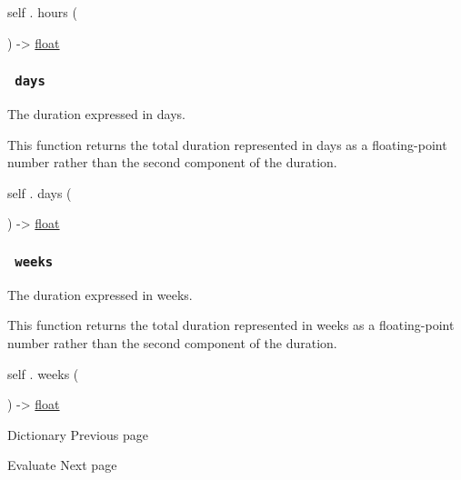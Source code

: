 self { . } { hours } (

) -\textgreater{} \href{/docs/reference/foundations/float/}{float}

\subsubsection{\texorpdfstring{\texttt{\ days\ }}{ days }}\label{definitions-days}

The duration expressed in days.

This function returns the total duration represented in days as a
floating-point number rather than the second component of the duration.

self { . } { days } (

) -\textgreater{} \href{/docs/reference/foundations/float/}{float}

\subsubsection{\texorpdfstring{\texttt{\ weeks\ }}{ weeks }}\label{definitions-weeks}

The duration expressed in weeks.

This function returns the total duration represented in weeks as a
floating-point number rather than the second component of the duration.

self { . } { weeks } (

) -\textgreater{} \href{/docs/reference/foundations/float/}{float}

\href{/docs/reference/foundations/dictionary/}{\pandocbounded{}}

{ Dictionary } { Previous page }

\href{/docs/reference/foundations/eval/}{\pandocbounded{}}

{ Evaluate } { Next page }
